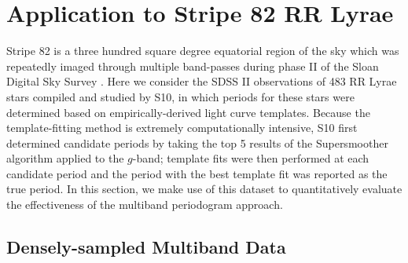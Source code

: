 \documentclass{emulateapj}
\newcommand{\sectlabel}[1]{\label{sect:#1}}
\begin{document}
\section{Application to Stripe 82 RR Lyrae}
\sectlabel{stripe82}
Stripe 82 is a three hundred square degree equatorial region of the sky which was repeatedly imaged through multiple band-passes during phase II of the Sloan Digital Sky Survey \citep[SDSS II, see][]{Sesar2007}.
Here we consider the SDSS II observations of 483 RR Lyrae stars compiled and studied by S10, in which periods for these stars were determined based on empirically-derived light curve templates.
Because the template-fitting method is extremely computationally intensive, S10 first determined candidate periods by taking the top 5 results of the Supersmoother \citep{Reimann94} algorithm applied to the $g$-band; template fits were then performed at each candidate period and the period with the best template fit was reported as the true period. In this section, we make use of this dataset to quantitatively evaluate the effectiveness of the multiband periodogram approach.

\subsection{Densely-sampled Multiband Data}
\end{document}
